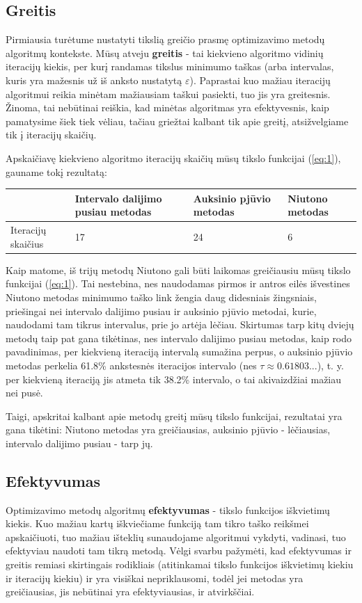 \documentclass{article}
\begin{document}
\subsection{Greitis}
Pirmiausia turėtume nustatyti tikslią greičio prasmę optimizavimo metodų algoritmų kontekste. Mūsų atveju \textbf{greitis} - tai kiekvieno algoritmo vidinių iteracijų kiekis, per kurį randamas tikslus minimumo taškas (arba intervalas, kuris yra mažesnis už iš anksto nustatytą $\varepsilon$). Paprastai kuo mažiau iteracijų algoritmui reikia minėtam mažiausiam taškui pasiekti, tuo jis yra greitesnis. Žinoma, tai nebūtinai reiškia, kad minėtas algoritmas yra efektyvesnis, kaip pamatysime šiek tiek vėliau, tačiau griežtai kalbant tik apie greitį, atsižvelgiame tik į iteracijų skaičių.

Apskaičiavę kiekvieno algoritmo iteracijų skaičių mūsų tikslo funkcijai (\ref{eq:1}), gauname tokį rezultatą:
\begin{table}[H]
    \centering
    \begin{tabular}{|p{3cm}|p{3cm}|p{3cm}|p{3cm}|}
    \hline
    \multicolumn{1}{|l|}{} & Intervalo dalijimo pusiau metodas & Auksinio pjūvio metodas & Niutono metodas \\ \hline
                       Iteracijų skaičius    & 17 & 24 & 6 \\ \hline
    \end{tabular}
\end{table}
Kaip matome, iš trijų metodų Niutono gali būti laikomas greičiausiu mūsų tikslo funkcijai (\ref{eq:1}). Tai nestebina, nes naudodamas pirmos ir antros eilės išvestines Niutono metodas minimumo taško link žengia daug didesniais žingsniais, priešingai nei intervalo dalijimo pusiau ir auksinio pjūvio metodai, kurie, naudodami tam tikrus intervalus, prie jo artėja lėčiau. Skirtumas tarp kitų dviejų metodų taip pat gana tikėtinas, nes intervalo dalijimo pusiau metodas, kaip rodo pavadinimas, per kiekvieną iteraciją intervalą sumažina perpus, o auksinio pjūvio metodas perkelia 61.8\% ankstesnės iteracijos intervalo (nes $\tau \approx 0.61803...$), t. y. per kiekvieną iteraciją jis atmeta tik 38.2\% intervalo, o tai akivaizdžiai mažiau nei pusė.

Taigi, apskritai kalbant apie metodų greitį mūsų tikslo funkcijai, rezultatai yra gana tikėtini: Niutono metodas yra greičiausias, auksinio pjūvio - lėčiausias, intervalo dalijimo pusiau - tarp jų.
\subsection{Efektyvumas}
Optimizavimo metodų algoritmų \textbf{efektyvumas} - tikslo funkcijos iškvietimų kiekis. Kuo mažiau kartų iškviečiame funkciją tam tikro taško reikšmei apskaičiuoti, tuo mažiau išteklių sunaudojame algoritmui vykdyti, vadinasi, tuo efektyviau naudoti tam tikrą metodą. Vėlgi svarbu pažymėti, kad efektyvumas ir greitis remiasi skirtingais rodikliais (atitinkamai tikslo funkcijos iškvietimų kiekiu ir iteracijų kiekiu) ir yra visiškai nepriklausomi, todėl jei metodas yra greičiausias, jis nebūtinai yra efektyviausias, ir atvirkščiai.
\end{document}
